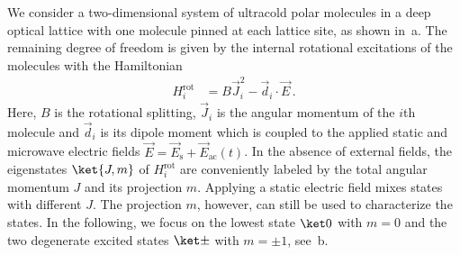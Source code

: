 We consider a two-dimensional system of ultracold polar molecules in a deep optical lattice with one molecule pinned at each lattice site, as shown in~a.
The remaining degree of freedom is given by the internal rotational excitations of the molecules with the Hamiltonian
\begin{align}
    H^{\text{rot}}_i &= B \vec{J}_i^2 - \vec{d}_i\cdot\vec{E}\,.
\end{align}
Here, $B$ is the rotational splitting, $\vec{J}_i$ is the angular momentum of the $i$th molecule and $\vec{d}_i$ is its dipole moment which is coupled to the applied static and microwave electric fields $\vec{E} = \vec{E}_{\text{s}} + \vec{E}_{\text{ac}}(t)$.
In the absence of external fields, the eigenstates $\ket{J,m}$ of $H^{\text{rot}}_{i}$ are conveniently labeled by the total angular momentum $J$ and its projection $m$.
Applying a static electric field mixes states with different $J$.
The projection $m$, however, can still be used to characterize the states.
In the following, we focus on the lowest state $\ketz$ with $m=0$ and the two degenerate excited states $\ketpm$ with $m = \pm 1$, see~b.



